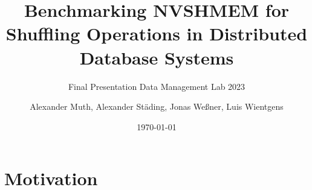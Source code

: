 \documentclass[
	ngerman,%
	aspectratio=169,%
	color={accentcolor=8c},
	logo=true,%
	colorframetitle=true,%
    authorontitle=true,
	]{tudabeamer}
\begin{document}
\title{Benchmarking NVSHMEM for Shuffling Operations in Distributed Database Systems}
\subtitle{Final Presentation Data Management Lab 2023}
\author[A. Muth, A. Städing, J. Weßner, L. Wientgens]{Alexander Muth, Alexander Städing, Jonas Weßner, Luis Wientgens}



\date{\today}

\maketitle

\section{Motivation}
\end{document}
